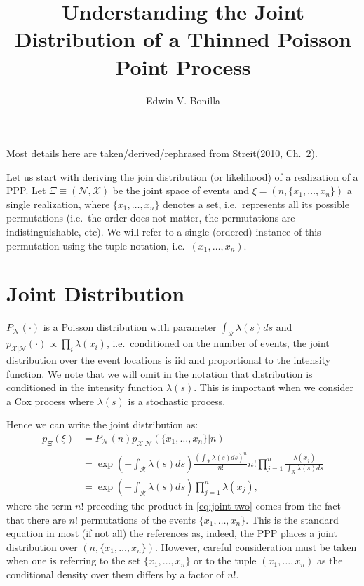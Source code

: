 \documentclass{article}
\title{Understanding the Joint Distribution of a Thinned Poisson Point Process}
\author{Edwin V. Bonilla}
\newcommand{\calR}{\mathcal{R}}
\newcommand{\ls}{\lambda(s)}
\begin{document}
	\maketitle
	Most details here are taken/derived/rephrased from Streit(2010, Ch.~2). 
	
	Let us start with deriving the join distribution (or likelihood) of a realization of a \gls{PPP}. Let $\Xi \equiv (\mathcal{N}, \mathcal{X})$  be the joint space of events and $\xi = (n, \{x_1, \ldots, x_n\})$ a single realization, where $\{x_1, \ldots, x_n \}$ denotes a set, i.e.~represents all its possible permutations (i.e.~the order does not matter, the permutations are indistinguishable, etc). We will refer to a single (ordered) instance of this permutation using the tuple notation, i.e.~$(x_1, \ldots, x_n)$.
	
	\section{Joint Distribution}
	
	$P_{\mathcal{N}}(\cdot)$ is a Poisson distribution with parameter $\int_{\calR} \ls ds$ and $p_{\mathcal{X} | \mathcal{N}} (\cdot) \propto \prod_{i}   \lambda(x_i)$, i.e.~conditioned on the number of events, the joint distribution over the event locations is iid and proportional to the intensity function. We note that we will omit in the notation that distribution is conditioned in the intensity function $\ls$. This is important when we consider a Cox process where $\ls$ is a stochastic process. 
	  
	Hence we can write the joint distribution as:
	\begin{align}
	p_{\Xi}(\xi) &= P_{\mathcal{N}}(n) p_{\mathcal{X} | \mathcal{N}}(\{x_1, \ldots, x_n \} | n )\\
	\label{eq:joint-two}
	&= \exp\left(-\int_{\calR} \ls ds\right) \frac{\left(\int_{\calR} \ls ds \right)^{n}}{n!} n! \prod_{j=1}^{n}  \frac{\lambda(x_j)}{\int_{\calR} \lambda(s) ds} \\
	\label{eq:joint-three}
	&= \exp\left(-\int_{\calR} \ls ds\right) \prod_{j=1}^{n}  {\lambda(x_j)} \text{,}
	\end{align}
	where the term $n!$ preceding the product in \cref{eq:joint-two} comes from the fact that there are $n!$ permutations of the events $\{x_1, \ldots, x_n\}$. 
	This is the standard equation in most (if not all) the references as, indeed, the \gls{PPP} places a joint distribution over $(n, \{x_1, \ldots, x_n\})$. However, careful consideration must be taken when one is referring to the set $\{x_1, \ldots, x_n\}$ or to the tuple $(x_1, \ldots, x_n)$ as the conditional density over them differs by a factor of  $n!$.  
\end{document}
